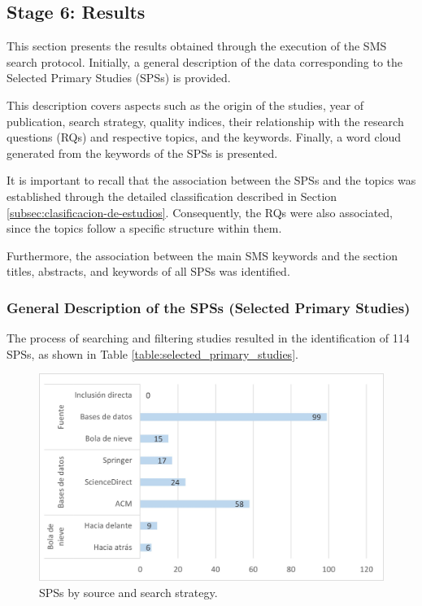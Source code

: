 \subsection{Stage 6: Results}
This section presents the results obtained through the execution of the SMS search protocol. Initially, a general description of the data corresponding to the Selected Primary Studies (SPSs) is provided.

This description covers aspects such as the origin of the studies, year of publication, search strategy, quality indices, their relationship with the research questions (RQs) and respective topics, and the keywords. Finally, a word cloud generated from the keywords of the SPSs is presented.

It is important to recall that the association between the SPSs and the topics was established through the detailed classification described in Section \ref{subsec:clasificacion-de-estudios}. Consequently, the RQs were also associated, since the topics follow a specific structure within them.

Furthermore, the association between the main SMS keywords and the section titles, abstracts, and keywords of all SPSs was identified.

\subsubsection{General Description of the SPSs (Selected Primary Studies)}
The process of searching and filtering studies resulted in the identification of 114 SPSs, as shown in Table \ref{table:selected_primary_studies}.

\begin{figure}[htbp]
	\centering
	\vspace{10pt}
	\includegraphics[scale=0.7]{resources/figures/SPSsByProcedence.jpg}
	\vspace{6pt}
	\caption{SPSs by source and search strategy.}
	\label{fig:SPSsByProcedence}
\end{figure}


